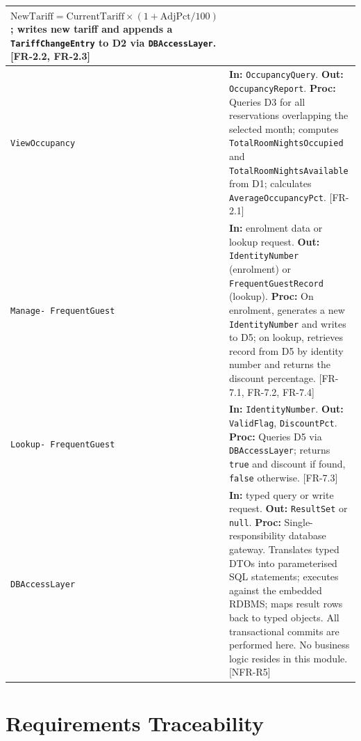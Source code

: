 \documentclass[12pt,a4paper]{article}
\begin{document}
\begin{longtable}{|L{3.2cm}|L{10.5cm}|}
      $\text{NewTariff} = \text{CurrentTariff} \times (1 + \text{AdjPct}/100)$;
      writes new tariff and appends a \texttt{TariffChangeEntry} to D2 via
      \texttt{DBAccessLayer}. [FR-2.2, FR-2.3] \\
  \hline
  \texttt{ViewOccupancy}
    & \textbf{In:} \texttt{OccupancyQuery}. \textbf{Out:} \texttt{OccupancyReport}.
      \textbf{Proc:} Queries D3 for all reservations overlapping the selected month;
      computes \texttt{TotalRoomNightsOccupied} and \texttt{TotalRoomNightsAvailable}
      from D1; calculates \texttt{AverageOccupancyPct}. [FR-2.1] \\
  \hline
  \texttt{Manage-
  FrequentGuest}
    & \textbf{In:} enrolment data or lookup request. \textbf{Out:} \texttt{IdentityNumber}
      (enrolment) or \texttt{FrequentGuestRecord} (lookup).
      \textbf{Proc:} On enrolment, generates a new \texttt{IdentityNumber} and writes
      to D5; on lookup, retrieves record from D5 by identity number and returns the
      discount percentage. [FR-7.1, FR-7.2, FR-7.4] \\
  \hline
  \texttt{Lookup-
  FrequentGuest}
    & \textbf{In:} \texttt{IdentityNumber}. \textbf{Out:} \texttt{ValidFlag},
      \texttt{DiscountPct}.
      \textbf{Proc:} Queries D5 via \texttt{DBAccessLayer}; returns \texttt{true} and
      discount if found, \texttt{false} otherwise. [FR-7.3] \\
  \hline
  \texttt{DBAccessLayer}
    & \textbf{In:} typed query or write request. \textbf{Out:} \texttt{ResultSet} or
      \texttt{null}.
      \textbf{Proc:} Single-responsibility database gateway. Translates typed DTOs
      into parameterised SQL statements; executes against the embedded RDBMS; maps
      result rows back to typed objects. All transactional commits are performed here.
      No business logic resides in this module. [NFR-R5] \\
  \hline
\end{longtable}

\newpage

\section{Requirements Traceability}
\label{sec:trace}
\end{document}
